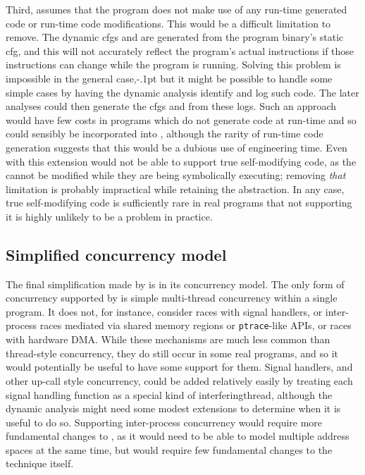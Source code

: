 Third, {\implementation} assumes that the program does not make use of
any run-time generated code or run-time code modifications.  This
would be a difficult limitation to remove.  The \glspl{dynamic cfg}
and {\StateMachines} are generated from the program binary's
\gls{static cfg}, and this will not accurately reflect the program's
actual instructions if those instructions can change while the program
is running.  Solving this problem is impossible in the general
case,\kern-.1pt but it
might be possible to handle some simple cases by having the dynamic
analysis identify and log such code.  The later analyses could then
generate the \glspl{cfg} and {\StateMachines} from these logs.  Such
an approach would have few costs in programs which do not generate
code at run-time and so could sensibly be incorporated into
{\implementation}, although the rarity of run-time code generation
suggests that this would be a dubious use of engineering time.  Even
with this extension {\implementation} would not be able to support
true self-modifying code, as the {\StateMachines} cannot be modified
while they are being symbolically executing; removing \emph{that}
limitation is probably impractical while retaining the {\StateMachine}
abstraction.  In any case, true self-modifying code is sufficiently
rare in real programs that not supporting it is highly unlikely to be
a problem in practice.

\subsection{Simplified concurrency model}
The final simplification made by {\implementation} is in its
concurrency model.  The only form of concurrency supported by
{\implementation} is simple multi-thread concurrency within a single
program.  It does not, for instance, consider races with signal
handlers, or inter-process races mediated via shared memory regions or
\texttt{ptrace}-like APIs, or races with hardware DMA.  While these
mechanisms are much less common than thread-style concurrency, they do
still occur in some real programs, and so it would potentially be
useful to have some support for them.  Signal handlers, and other
up-call style concurrency, could be added relatively easily by
treating each signal handling function as a special kind of
\gls{interferingthread}, although the dynamic analysis might need some
modest extensions to determine when it is useful to do so.  Supporting
inter-process concurrency would require more fundamental changes to
{\implementation}, as it would need to be able to model multiple
address spaces at the same time, but would require few fundamental
changes to the {\technique} technique itself.


